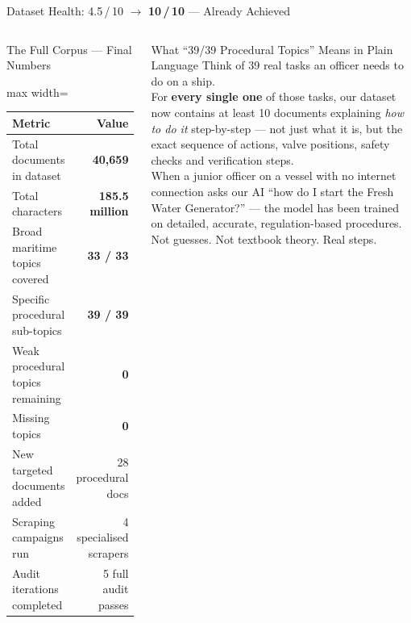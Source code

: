 \documentclass[aspectratio=169,11pt]{beamer}
\begin{document}
\begin{frame}[shrink=8]{Dataset Health: 4.5\,/\,10 $\longrightarrow$ \textbf{10\,/\,10} — Already Achieved}

\begin{columns}[T]

\begin{block}{The Full Corpus — Final Numbers}
  \scriptsize
  \begin{adjustbox}{max width=\linewidth}
  \begin{tabular}{@{}lr@{}}
    \toprule
    \textbf{Metric} & \textbf{Value}\\
    \midrule
    Total documents in dataset & \textbf{40{,}659}\\
    Total characters & \textbf{185.5 million}\\
    Broad maritime topics covered & \textbf{33 / 33}\\
    Specific procedural sub-topics & \textbf{39 / 39}\\
    Weak procedural topics remaining & \textbf{0}\\
    Missing topics & \textbf{0}\\
    \midrule
    New targeted documents added & 28 procedural docs\\
    Scraping campaigns run & 4 specialised scrapers\\
    Audit iterations completed & 5 full audit passes\\
    \bottomrule
  \end{tabular}
  \end{adjustbox}
\end{block}

\vspace{4pt}
\begin{block}{What ``39/39 Procedural Topics'' Means in Plain Language}
  \scriptsize\RaggedRight
  Think of 39 real tasks an officer needs to do on a ship.\\[3pt]
  For \textbf{every single one} of those tasks, our dataset now
  contains at least 10 documents explaining \emph{how to do it}
  step-by-step — not just what it is, but the exact sequence of
  actions, valve positions, safety checks and verification steps.\\[3pt]
  When a junior officer on a vessel with no internet connection
  asks our AI ``how do I start the Fresh Water Generator?'' — the
  model has been trained on detailed, accurate, regulation-based
  procedures. Not guesses. Not textbook theory. Real steps.
\end{block}


\end{columns}
\end{frame}
\end{document}
